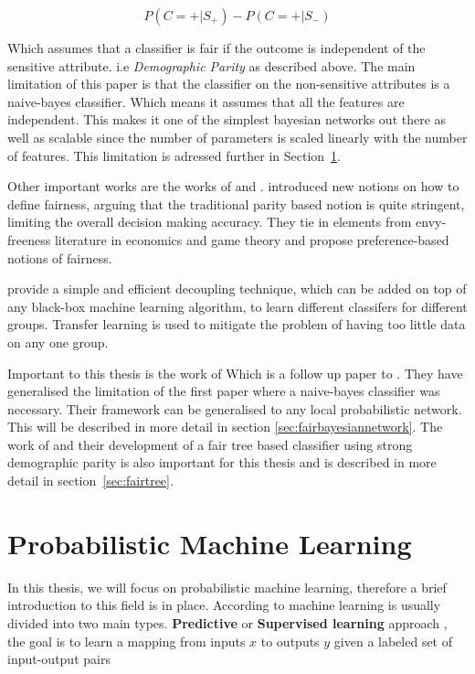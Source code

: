 \begin{equation*}
    P(C=+|S_+) - P(C=+|S_-)
\end{equation*}

Which assumes that a classifier is fair if the outcome is independent of the sensitive attribute. i.e \textit{Demographic Parity} as described above. The main limitation of this paper is that the classifier on the non-sensitive attributes is a naive-bayes classifier. Which means it assumes that all the features are independent. This makes it one of the simplest bayesian networks out there as well as scalable since the number of parameters is scaled linearly with the number of features. This limitation is adressed further in Section~\ref{sec:probmac}.

Other important works are the works of \cite{Zafar:2017:NIPS} and \citet{Dwork:2018:PMLR}. \citet{Zafar:2017:NIPS} introduced new notions on how to define fairness, arguing that the traditional parity based notion is  quite stringent, limiting the overall decision making accuracy. They tie in elements from envy-freeness literature in economics and game theory and propose preference-based notions of fairness. 

\citet{Dwork:2018:PMLR} provide a simple and efficient decoupling technique, which can be added on top of any black-box machine learning algorithm, to learn different classifers for different groups. Transfer learning is used to mitigate the problem of having too little data on any one group.

Important to this thesis is the work of \citet{Choi:2021:AIII} Which is a follow up paper to \cite{Calders:20210:DMKD}. They have generalised the limitation of the first paper where a naive-bayes classifier was necessary. Their framework can be generalised to any local probabilistic network. This will be described in more detail in section \ref{sec:fairbayesiannetwork}. The work of \citet{Antonio:2021:arXiv} and their development of a fair tree based classifier using strong demographic parity is also important for this thesis and is described in more detail in section~\ref{sec:fairtree}.

\section{Probabilistic Machine Learning}
\label{sec:probmac}

In this thesis, we will focus on probabilistic machine learning, therefore a brief introduction to this field is in place. According to \citet{Murphy:2012:Book} machine learning is usually divided into two main types. \textbf{Predictive} or \textbf{Supervised learning} approach \cite[p.~2]{Murphy:2012:Book}, the goal is to learn a mapping from inputs $x$ to outputs $y$ given a labeled set of input-output pairs

